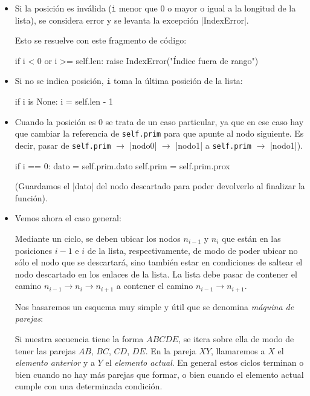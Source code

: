 \begin{itemize}

\item Si la posición es inválida (\lstinline!i! menor que $0$ o mayor o
igual a la longitud de la lista), se considera error y se levanta la
excepción |IndexError|.

Esto se resuelve con este fragmento de código:

\begin{codigo-python-sn}
if i < 0 or i >= self.len:
    raise IndexError("Índice fuera de rango")
\end{codigo-python-sn}

\item Si no se indica posición, \lstinline!i! toma la última posición de la
lista:

\begin{codigo-python-sn}
if i is None:
    i = self.len - 1
\end{codigo-python-sn}

\item Cuando la posición es $0$ se trata de un caso particular, ya que en ese
caso hay que cambiar la referencia de
\lstinline!self.prim! para que apunte al nodo siguiente.  Es decir, pasar de
\lstinline!self.prim! $\rightarrow$ |nodo0| $\rightarrow$ |nodo1| a
\lstinline!self.prim! $\rightarrow$ |nodo1|).

\begin{codigo-python-sn}
if i == 0:
    dato = self.prim.dato
    self.prim = self.prim.prox
\end{codigo-python-sn}

\noindent (Guardamos el |dato| del nodo descartado para poder devolverlo al
finalizar la función).

\item Vemos ahora el caso general:

Mediante un ciclo, se deben ubicar los nodos $n_{i - 1}$ y $n_i$ que
están en las posiciones $i-1$ e $i$ de la lista, respectivamente, de modo de
poder ubicar no sólo el nodo que se descartará, sino también estar en condiciones
de saltear el nodo descartado en los enlaces de la lista.  La lista debe pasar de
contener el camino $n_{i-1} \rightarrow n_i \rightarrow n_{i+1}$
a contener el camino $n_{i-1} \rightarrow n_{i+1}$.

Nos basaremos un esquema muy simple y útil que se denomina \emph{máquina de parejas}:

Si nuestra secuencia tiene la forma $ABCDE$, se itera sobre ella de modo de
tener las parejas $AB$, $BC$, $CD$, $DE$. En la pareja $XY$, llamaremos a $X$ el
\emph{elemento anterior}
y a $Y$ el \emph{elemento actual}. En general estos ciclos terminan o bien cuando
no hay más parejas que formar, o bien cuando el elemento actual cumple con una determinada
condición.


\end{itemize}
